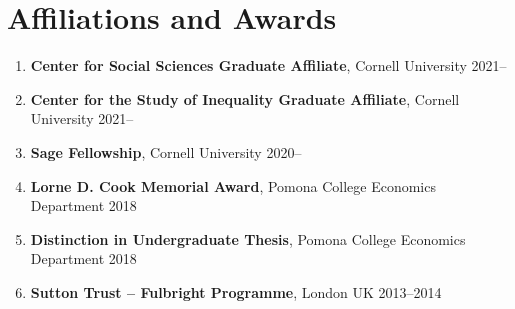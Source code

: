 \documentclass[letterpaper,11pt,oneside]{article}
\begin{document}
\section*{Affiliations and Awards}
\begin{enumerate}[itemsep=2pt, label={}]
    \item \textbf{Center for Social Sciences Graduate Affiliate}, Cornell University \hfill 2021--
    \item \textbf{Center for the Study of Inequality Graduate Affiliate}, Cornell University \hfill 2021--
    \item \textbf{Sage Fellowship}, Cornell University \hfill 2020--
    \item \textbf{Lorne D. Cook Memorial Award}, Pomona College Economics Department \hfill 2018
    \item \textbf{Distinction in Undergraduate Thesis}, Pomona College Economics Department \hfill 2018
    \item \textbf{Sutton Trust -- Fulbright Programme}, London UK \hfill 2013--2014
\end{enumerate}
\end{document}
